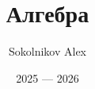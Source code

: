 

\title{\Huge Алгебра}
\author{\huge Sokolnikov Alex}
\date{\LARGE 2025 --- 2026}


    \pagestyle{fancy}
    \maketitle
    \tableofcontents
    \newpage



